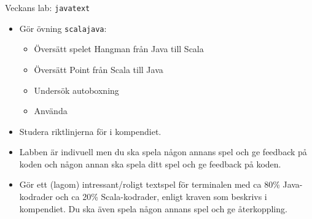 


\begin{Slide}{Veckans lab: \texttt{javatext}}\SlideFontSmall
{}
\begin{itemize}
\item Gör övning \texttt{scalajava}:
\begin{itemize}\SlideFontSmall
\item Översätt spelet Hangman från Java till Scala
\item Översätt Point från Scala till Java
\item Undersök autoboxning 
\item Använda 
\end{itemize}
\item Studera riktlinjerna för  i kompendiet.
\item Labben är indivuell men du ska spela någon annans spel och ge feedback på koden och någon annan ska spela ditt spel och ge feedback på koden.
\end{itemize}
\begin{itemize}
\item Gör ett (lagom) intressant/roligt textspel för terminalen med ca 80\% Java-kodrader och ca 20\% Scala-kodrader, enligt kraven som beskrivs i kompendiet. Du ska även spela någon annans spel och ge återkoppling.
\end{itemize}
\end{Slide}
